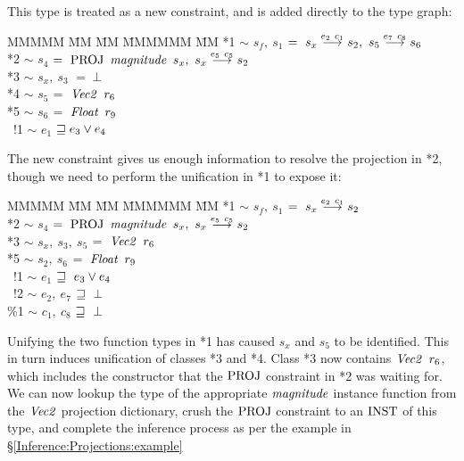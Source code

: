 
This type is treated as a new constraint, and is added directly to the type graph:
\begin{tabbing}
MMMMM	\= MM 	\= MM 		\= MMMMMM 		\= MM \kill
	\> *1	\> $\sim$	\> $s_f, \ s_1$		\> $= \ s_x \stackrel{e_2 \ c_{1}}{\longrightarrow} s_2, \
								s_5 \stackrel{e_7 \ c_8}{\longrightarrow} s_6$\\
	\> *2	\> $\sim$	\> $s_4$		\> $= \ \textrm{PROJ} \ \operatorname{\mathit{magnitude}} \ s_x, \
								s_x \stackrel{e_5 \ c_5}{\longrightarrow} s_2$ \\
	\> *3	\> $\sim$	\> $s_x, \ s_3$		\> $= \ \bot$ \\
	\> *4	\> $\sim$	\> $s_5$		\> $= \ \operatorname{\mathit{Vec2}} \ r_6$ \\
	\> *5	\> $\sim$	\> $s_6$		\> $= \ \operatorname{\mathit{Float}} \ r_9$ \\
	\> \ !1	\> $\sim$	\> $e_1$		\> $\sqsupseteq e_3 \lor e_4$
\end{tabbing}
The new constraint gives us enough information to resolve the projection in *2, though we need to perform the unification in *1 to expose it:
\begin{tabbing}
MMMMM	\= MM 	\= MM 		\= MMMMMM 		\= MM \kill
	\> *1	\> $\sim$	\> $s_f, \ s_1$		\> $= \ s_x \stackrel{e_2 \ c_{1}}{\longrightarrow} s_2$ \\
	\> *2	\> $\sim$	\> $s_4$		\> $= \ \textrm{PROJ} \ \operatorname{\mathit{magnitude}} \ s_x, \
								s_x \stackrel{e_5 \ c_5}{\longrightarrow} s_2$ \\
	\> *3	\> $\sim$	\> $s_x, \ s_3, \ s_5$	\> $= \ \operatorname{\mathit{Vec2}} \ r_6$ \\
	\> *5	\> $\sim$	\> $s_2, \ s_6$		\> $= \ \operatorname{\mathit{Float}} \ r_9$ \\
	\> \ !1	\> $\sim$	\> $e_1$		\> $\sqsupseteq \ e_3 \lor e_4$ \\
	\> \ !2 \> $\sim$	\> $e_2, \ e_7$		\> $\sqsupseteq \ \bot$ \\
	\> \%1	\> $\sim$	\> $c_1, \ c_8$		\> $\sqsupseteq \ \bot$ 
\end{tabbing}
Unifying the two function types in *1 has caused $s_x$ and $s_5$ to be identified. This in turn induces unification of classes *3 and *4. Class *3 now contains $\operatorname{\mathit{Vec2}} \ r_6$, which includes the constructor that the $\textrm{PROJ}$ constraint in *2 was waiting for. We can now lookup the type of the appropriate $\operatorname{\mathit{magnitude}}$ instance function from the $\operatorname{\mathit{Vec2}}$ projection dictionary, crush the $\textrm{PROJ}$ constraint to an $\textrm{INST}$ of this type, and complete the inference process as per the example in \S\ref{Inference:Projections:example}



